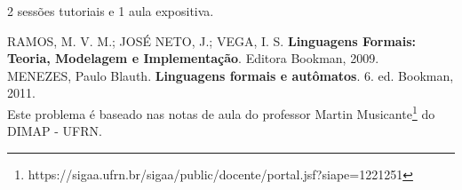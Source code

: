 2 sessões tutoriais e 1 aula expositiva.

RAMOS, M. V. M.; JOSÉ NETO, J.; VEGA, I. S. \textbf{Linguagens Formais: Teoria, Modelagem e Implementação}. Editora Bookman, 2009.\\

\noindent
MENEZES, Paulo Blauth. \textbf{Linguagens formais e autômatos}. 6. ed. Bookman, 2011.\\

Este problema é baseado nas notas de aula do professor Martin Musicante\footnote{\scriptsize{https://sigaa.ufrn.br/sigaa/public/docente/portal.jsf?siape=1221251}} do DIMAP - UFRN.
